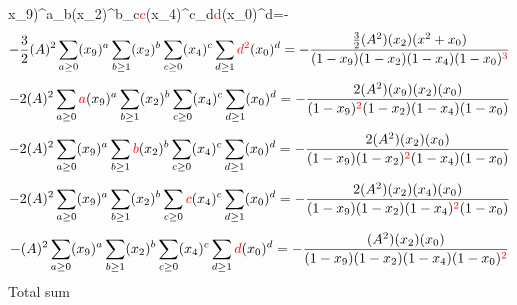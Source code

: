 \documentclass{article}
\begin{document}
x_9)^{a}\sum_{b}(x_2)^{b}\sum_{c}\textcolor{red}{c}(x_4)^{c}\sum_{d}\textcolor{red}{d}(x_0)^{d}=-\]\[-\frac{3}{2}(A)^{2}\sum_{a\geq{0}}(x_9)^{a}\sum_{b\geq{1}}(x_2)^{b}\sum_{c\geq{0}}(x_4)^{c}\sum_{d\geq{1}}\textcolor{red}{d^{2}}(x_0)^{d}=-\frac{\frac{3}{2}(A^{2})(x_2)(x^{2}+x_0)}{(1-x_9)(1-x_2)(1-x_4)(1-x_0)^{\textcolor{red}{3}}}\]\[-2(A)^{2}\sum_{a\geq{0}}\textcolor{red}{a}(x_9)^{a}\sum_{b\geq{1}}(x_2)^{b}\sum_{c\geq{0}}(x_4)^{c}\sum_{d\geq{1}}(x_0)^{d}=-\frac{2(A^{2})(x_9)(x_2)(x_0)}{(1-x_9)^{\textcolor{red}{2}}(1-x_2)(1-x_4)(1-x_0)}\]\[-2(A)^{2}\sum_{a\geq{0}}(x_9)^{a}\sum_{b\geq{1}}\textcolor{red}{b}(x_2)^{b}\sum_{c\geq{0}}(x_4)^{c}\sum_{d\geq{1}}(x_0)^{d}=-\frac{2(A^{2})(x_2)(x_0)}{(1-x_9)(1-x_2)^{\textcolor{red}{2}}(1-x_4)(1-x_0)}\]\[-2(A)^{2}\sum_{a\geq{0}}(x_9)^{a}\sum_{b\geq{1}}(x_2)^{b}\sum_{c\geq{0}}\textcolor{red}{c}(x_4)^{c}\sum_{d\geq{1}}(x_0)^{d}=-\frac{2(A^{2})(x_2)(x_4)(x_0)}{(1-x_9)(1-x_2)(1-x_4)^{\textcolor{red}{2}}(1-x_0)}\]\[-(A)^{2}\sum_{a\geq{0}}(x_9)^{a}\sum_{b\geq{1}}(x_2)^{b}\sum_{c\geq{0}}(x_4)^{c}\sum_{d\geq{1}}\textcolor{red}{d}(x_0)^{d}=-\frac{(A^{2})(x_2)(x_0)}{(1-x_9)(1-x_2)(1-x_4)(1-x_0)^{\textcolor{red}{2}}}\]
Total sum
\end{document}
